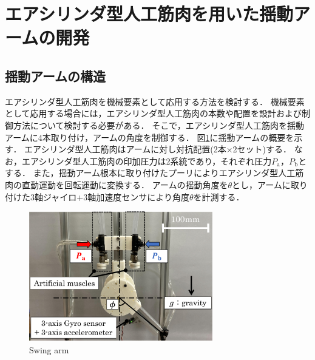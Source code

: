 \section{エアシリンダ型人工筋肉を用いた揺動アームの開発}%
\subsection{揺動アームの構造}
エアシリンダ型人工筋肉を機械要素として応用する方法を検討する．
機械要素として応用する場合には，エアシリンダ型人工筋肉の本数や配置を設計および制御方法について検討する必要がある．
そこで，エアシリンダ型人工筋肉を揺動アームに4本取り付け，アームの角度を制御する．
図\ref{Swing arm}に揺動アームの概要を示す．
エアシリンダ型人工筋肉はアームに対し対抗配置(2本×2セット)する．
なお，エアシリンダ型人工筋肉の印加圧力は2系統であり，それぞれ圧力$P_\mathrm{a}$，$P_\mathrm{b}$とする．
また，揺動アーム根本に取り付けたプーリによりエアシリンダ型人工筋肉の直動運動を回転運動に変換する．
アームの揺動角度を$\theta$とし，アームに取り付けた3軸ジャイロ+3軸加速度センサにより角度$\theta$を計測する．
\begin{figure}[t]
  \centering
  \includegraphics[width=80mm]{_pdf/swing_arm.pdf}
  \caption{Swing arm}
  \label{Swing arm}
\end{figure}

